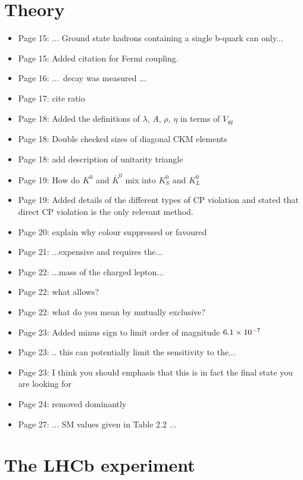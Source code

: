 \documentclass[12pt]{article}
\begin{document}
\section{Theory}
\begin{itemize}
\item Page 15: ... Ground state hadrons {\color{red}containing a single b-quark} can only...
\item Page 15: Added citation for Fermi coupling.
\item Page 16: ... decay {\color{red}was} measured ... 
\item Page 17: {\color{blue}cite ratio}
\item Page 18: Added the definitions of $\lambda$, $A$, $\rho$, $\eta$ in terms of $V_{qq}$
\item Page 18: Double checked sizes of diagonal CKM elements
\item Page 18: {\color{blue} add description of unitarity triangle}
\item Page 19: {\color{blue} How do $K^{0}$ and $\bar{K}^{0}$ mix into $K_{S}^{0}$ and $K_{L}^{0}$}
\item Page 19: Added details of the different types of CP violation and stated that direct CP violation is the only relevant method.
\item Page 20: {\color{blue} explain why colour suppressed or favoured}
\item Page 21: ...expensive {\color{red}and} requires the...
\item Page 22: ...mass {\color{red}of the} charged lepton...

\item Page 22: {\color{blue} what allows?}
\item Page 22: {\color{blue} what do you mean by mutually exclusive?}
\item Page 23: Added minus sign to limit order of magnitude $6.1\times10^{{\color{red}-}7}$
\item Page 23: .. this can {\color{red}potentially} limit the sensitivity {\color{red}to} the...
\item Page 23: {\color{blue}I think you should emphasis that this is in fact the final state you are looking for}
\item Page 24: removed {\color{red}dominantly}
\item Page 27: ... SM values given {\color{red}in Table 2.2} ...
\end{itemize}
\section{The LHCb experiment}
\end{document}
